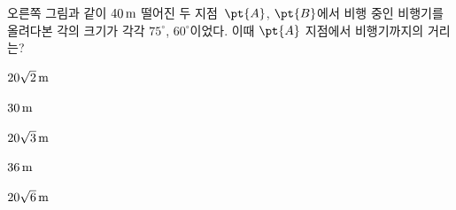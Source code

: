 \noindent\begin{minipage}[t]{0.58\linewidth}\vspace{0pt}\raggedright 오른쪽 그림과 같이 $40\mkern3mu \mathrm{m}$ 떨어진 두 지점~$\pt{A}$, $\pt{B}$에서 비행 중인 비행기를 올려다본 각의 크기가 각각 $75^\circ$, $60^\circ$이었다. 이때 $\pt{A}$ 지점에서 비행기까지의 거리는?\end{minipage}\hfill\begin{minipage}[t]{0.4\linewidth}\vspace{0pt}\centering \resizebox{\ifdim\width>\linewidth\linewidth\else\width\fi}{!}{}\end{minipage}\par
\begin{choicesii}{\rule[-3ex]{0pt}{8ex}$20\sqrt{2}\mkern3mu \mathrm{m}$}{\rule[-3ex]{0pt}{8ex}$30\mkern3mu \mathrm{m}$}{\rule[-3ex]{0pt}{8ex}$20\sqrt{3}\mkern3mu \mathrm{m}$}{\rule[-3ex]{0pt}{8ex}$36\mkern3mu \mathrm{m}$}{\rule[-3ex]{0pt}{8ex}$20\sqrt{6}\mkern3mu \mathrm{m}$}\end{choicesii}
